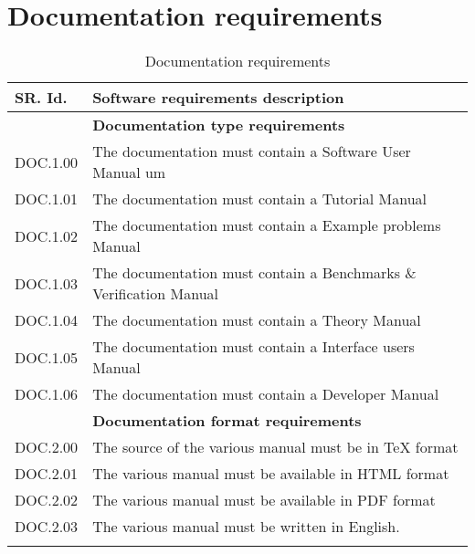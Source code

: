 \section{Documentation requirements}

\begin{longtable}{%
    |>{\columncolor[gray]{.8}}p{}%
    |>{\columncolor[gray]{.95}}p{}|}
  \hline
  \rowcolor[gray]{.8}   SR. Id. & Software requirements description \\
  \hline 
  & \textbf{ Documentation type requirements }\\
  \hline
  DOC.1.00 & The documentation must contain a Software User Manual \ac{um}  \\
  DOC.1.01 & The documentation must contain a Tutorial Manual\\
  DOC.1.02 & The documentation must contain a Example problems Manual\\
  DOC.1.03 & The documentation must contain a Benchmarks \& Verification Manual\\
  DOC.1.04 & The documentation must contain a Theory Manual\\
  DOC.1.05 & The documentation must contain a Interface users Manual\\
  DOC.1.06 & The documentation must contain a Developer Manual\\
  \hline 
  & \textbf{ Documentation format requirements }\\
  \hline
  DOC.2.00 & The source of the various manual must be in TeX format\\
  DOC.2.01 & The various manual must be available in HTML format\\
  DOC.2.02 & The various manual must be available in PDF format\\
  DOC.2.03 & The various manual must be written in English.\\
 \hline
  \caption{Documentation requirements}\\
\end{longtable}



